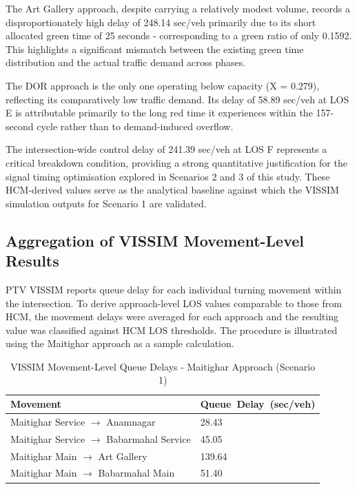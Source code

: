 The Art Gallery approach, despite carrying a relatively 
modest volume, records a disproportionately high delay of 
248.14 sec/veh primarily due to its short allocated green 
time of 25 seconds - corresponding to a green ratio of only 
0.1592. This highlights a significant mismatch between the 
existing green time distribution and the actual traffic 
demand across phases.

The DOR approach is the only one operating below capacity 
(X = 0.279), reflecting its comparatively low traffic 
demand. Its delay of 58.89 sec/veh at LOS E is attributable 
primarily to the long red time it experiences within the 
157-second cycle rather than to demand-induced overflow.

The intersection-wide control delay of 241.39 sec/veh at 
LOS F represents a critical breakdown condition, providing 
a strong quantitative justification for the signal timing 
optimisation explored in Scenarios 2 and 3 of this study. 
These HCM-derived values serve as the analytical baseline 
against which the VISSIM simulation outputs for Scenario 1 
are validated.

\subsection{Aggregation of VISSIM Movement-Level Results}

PTV VISSIM reports queue delay for each individual 
turning movement within the intersection. To derive 
approach-level LOS values comparable to those from HCM, 
the movement delays were averaged for each approach and 
the resulting value was classified against HCM LOS 
thresholds. The procedure is illustrated using the 
Maitighar approach as a sample calculation.

\begin{table}[h!]
   \centering
   \caption{VISSIM Movement-Level Queue Delays - Maitighar Approach (Scenario 1)}
   \begin{tabular}{|l|l|}
      \hline
      Movement & Queue\ Delay\ (sec/veh)\\
      \hline
      Maitighar Service $\rightarrow$ Anamnagar & 28.43 \\
      \hline
      Maitighar Service $\rightarrow$ Babarmahal Service	& 45.05 \\
      \hline
      Maitighar Main $\rightarrow$ Art Gallery	& 139.64 \\
      \hline
      Maitighar Main $\rightarrow$ Babarmahal Main	& 51.40 \\
      \hline
   \end{tabular}
   \label{tab:vissimmov}
\end{table}

